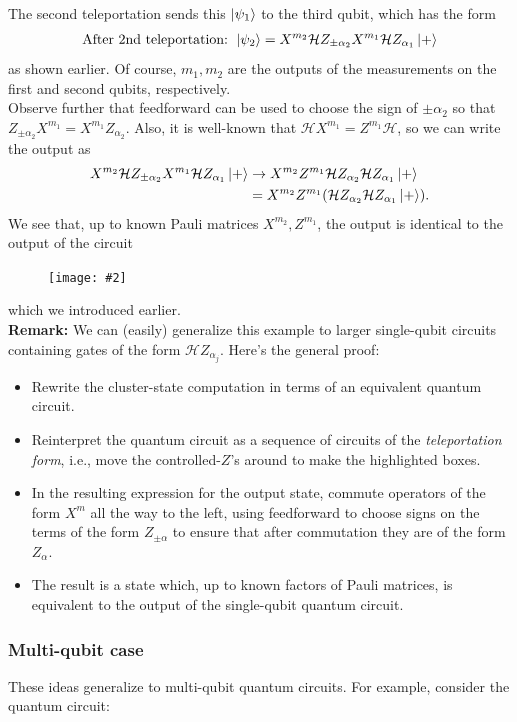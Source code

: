 \documentclass{book}
\theoremstyle{definition}
\newcommand{\nn}{\nonumber}
\newcommand{\had}{\mathcal{H}}
\newcommand{\al}{\alpha}
\newcommand{\fig}[2]{
	\begin{figure}[!htb]
		\centering
		\texttt{[image: \#2]}
	\end{figure}}
\begin{document}
The second teleportation sends this $\ket{\psi_1}$ to the third qubit, which has the form
\begin{align}
\text{After 2nd teleportation: } \ket{\psi_2}=  X^{m_2}  \had Z_{\pm \al_2} X^{m_1} \had Z_{\al_1}\ket{+}
\end{align}
as shown earlier. Of course, $m_1 ,m_2$ are the outputs of the measurements on the first and second qubits, respectively.\\

Observe further that feedforward can be used to choose the sign of $\pm \al_2$ so that $Z_{\pm  \al_2} X^{m_1} = X^{m_1}Z_{\al_2}$. Also, it is well-known that $\had X^{m_1} = Z^{m_1}\had$, so we can write the output as
\begin{align}
X^{m_2} \had Z_{\pm \al_2} X^{m_1} \had Z_{\al_1}\ket{+} &\to X^{m_2} Z^{m_1}\had Z_{\al_2}\had Z_{\al_1} \ket{+}\nn\\
&= X^{m_2} Z^{m_1} (\had Z_{\al_2} \had Z_{\al_1} \ket{+}) .
\end{align}
We see that, up to known Pauli matrices $X^{m_2}, Z^{m_1}$, the output is identical to the output of the circuit

\fig{0.5}{cluster3}

which we introduced earlier. \\


\noindent \textbf{Remark:} We can (easily) generalize this example to larger single-qubit circuits containing gates of the form $\had Z_{\al_j}$. Here's the general proof:
\begin{itemize}
	\item Rewrite the cluster-state computation in terms of an equivalent quantum circuit. 
	\item Reinterpret the quantum circuit as a sequence of circuits of the \textit{teleportation form}, i.e., move the controlled-$Z$'s around to make the highlighted boxes. 
	\item In the resulting expression for the output state, commute operators of the form $X^m$ all the way to the left, using feedforward to choose signs on the terms of the form $Z_{\pm \al}$ to ensure that after commutation they are of the form $Z_\al$.
	\item The result is a state which, up to known factors of Pauli matrices, is equivalent to the output of the single-qubit quantum circuit. 
\end{itemize}


\subsubsection{Multi-qubit case}
These ideas generalize to multi-qubit quantum circuits. For example, consider the quantum circuit:
\end{document}
